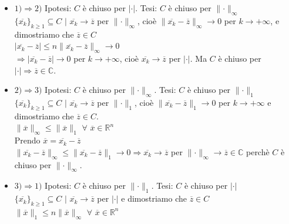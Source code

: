 \documentclass{article}
\newcommand{\R}{\mathbb{R}}
\newcommand{\C}{\mathbb{C}}
\begin{document}
\begin{itemize}
    \item $1) \Rightarrow 2)$ Ipotesi: $C$ è chiuso per $|\cdot|$. Tesi: $C$ è chiuso per $ \parallel \cdot \parallel_\infty$\\
        $\{\overline{x_k}\}_{k\geq 1} \subseteq C \,\, |\,\, \overline{x_k} \rightarrow \overline{z}$ per $\parallel \cdot \parallel_\infty$, cioè $\parallel \overline{x_k}-\overline{z} \parallel_\infty \rightarrow 0 $ per $k \rightarrow +\infty$, e dimostriamo che $\overline{z} \in C$\\
        $|\overline{x_k}-\overline{z}|\leq n \parallel \overline{x_k}-\overline{z} \parallel_\infty \rightarrow 0$\\
        $\Rightarrow |\overline{x_k}-\overline{z}| \rightarrow 0$ per $k \rightarrow +\infty$, cioè $\overline{x_k} \rightarrow \overline{z}$ per $|\cdot|$. Ma $C$ è chiuso per $|\cdot| \Rightarrow \overline{z} \in \C$.
    \item $2) \Rightarrow 3)$ Ipotesi: $C$ è chiuso per $\parallel \cdot \parallel_\infty$.        Tesi: $C$ è chiuso per $\parallel \cdot \parallel_1$\\
        $\{\overline{x_k}\}_{k \geq 1} \subseteq C \,\,|\,\, \overline{x_k} \rightarrow \overline{z}$ per $\parallel \cdot \parallel_1$, cioè $\parallel \overline{x_k}-\overline{z} \parallel_1 \rightarrow 0$ per $k \rightarrow +\infty$ e dimostriamo che $\overline{z}\in C$.\\
        $\parallel \overline{x} \parallel_\infty \leq \parallel \overline{x} \parallel_1 \,\, \forall \,\, \overline{x}\in \R^n$\\
        Prendo $\overline{x} = \overline{x_k} -\overline{z}$\\
        $\parallel \overline{x_k} -\overline{z} \parallel_\infty \leq  \parallel\overline{x_k} -\overline{z} \parallel_1 \rightarrow 0 \Rightarrow \overline{x_k}  \rightarrow \overline{z}$ per $\parallel \cdot \parallel_\infty \rightarrow \overline{z} \in \C$ perchè $C $ è chiuso  per $\parallel\cdot\parallel_\infty$.
    \item $3) \Rightarrow 1)$ Ipotesi: $C$ è chiuso per $\parallel \cdot \parallel_1$. Tesi:       $C$ è chiuso per $|\cdot|$\\
        $\{ \overline{x_k}\}_{k \geq 1} \subseteq C \,\, | \,\, \overline{x_k} \rightarrow \overline{z}$ per $|\cdot|$ e dimostriamo che $\overline{z} \in C$ \\
        $\parallel \overline{x} \parallel_1 \leq n \parallel \overline{x} \parallel_\infty \,\, \forall \,\, \overline{x} \in \R^n$\\

\end{itemize}
\end{document}

